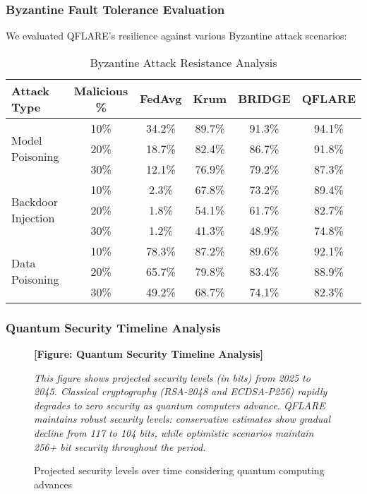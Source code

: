 \documentclass[journal]{IEEEtran}
\begin{document}
\subsubsection{Byzantine Fault Tolerance Evaluation}

We evaluated QFLARE's resilience against various Byzantine attack scenarios:

\begin{table}[htbp]
\centering
\caption{Byzantine Attack Resistance Analysis}
\begin{tabular}{|l|c|c|c|c|c|}
\hline
\textbf{Attack Type} & \textbf{Malicious \%} & \textbf{FedAvg} & \textbf{Krum} & \textbf{BRIDGE} & \textbf{QFLARE} \\
\hline
\multirow{3}{*}{Model Poisoning} & 10\% & 34.2\% & 89.7\% & 91.3\% & 94.1\% \\
& 20\% & 18.7\% & 82.4\% & 86.7\% & 91.8\% \\
& 30\% & 12.1\% & 76.9\% & 79.2\% & 87.3\% \\
\hline
\multirow{3}{*}{Backdoor Injection} & 10\% & 2.3\% & 67.8\% & 73.2\% & 89.4\% \\
& 20\% & 1.8\% & 54.1\% & 61.7\% & 82.7\% \\
& 30\% & 1.2\% & 41.3\% & 48.9\% & 74.8\% \\
\hline
\multirow{3}{*}{Data Poisoning} & 10\% & 78.3\% & 87.2\% & 89.6\% & 92.1\% \\
& 20\% & 65.7\% & 79.8\% & 83.4\% & 88.9\% \\
& 30\% & 49.2\% & 68.7\% & 74.1\% & 82.3\% \\
\hline
\end{tabular}
\end{table}

\subsubsection{Quantum Security Timeline Analysis}

\begin{figure}[htbp]
\centering
\textbf{[Figure: Quantum Security Timeline Analysis]}

\textit{This figure shows projected security levels (in bits) from 2025 to 2045. Classical cryptography (RSA-2048 and ECDSA-P256) rapidly degrades to zero security as quantum computers advance. QFLARE maintains robust security levels: conservative estimates show gradual decline from 117 to 104 bits, while optimistic scenarios maintain 256+ bit security throughout the period.}
\caption{Projected security levels over time considering quantum computing advances}
\end{figure}
\end{document}
